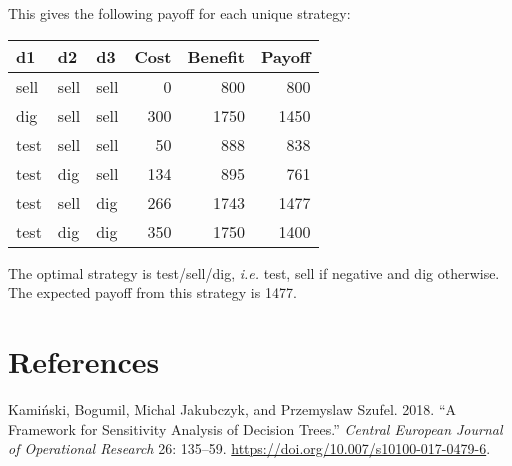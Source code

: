 \documentclass[
]{article}
\newenvironment{Shaded}{\begin{snugshade}}{\end{snugshade}}
\newcommand{\CommentTok}[1]{\textcolor[rgb]{0.56,0.35,0.01}{\textit{#1}}}
\newcommand{\KeywordTok}[1]{\textcolor[rgb]{0.13,0.29,0.53}{\textbf{#1}}}
\newcommand{\NormalTok}[1]{#1}
\newcommand{\OperatorTok}[1]{\textcolor[rgb]{0.81,0.36,0.00}{\textbf{#1}}}
\newcommand{\StringTok}[1]{\textcolor[rgb]{0.31,0.60,0.02}{#1}}
\begin{document}
\begin{Shaded}
\end{Shaded}

This gives the following payoff for each unique strategy:

\begin{longtable}[]{@{}lllrrr@{}}
\toprule
d1 & d2 & d3 & Cost & Benefit & Payoff\tabularnewline
\midrule
\endhead
sell & sell & sell & 0 & 800 & 800\tabularnewline
dig & sell & sell & 300 & 1750 & 1450\tabularnewline
test & sell & sell & 50 & 888 & 838\tabularnewline
test & dig & sell & 134 & 895 & 761\tabularnewline
test & sell & dig & 266 & 1743 & 1477\tabularnewline
test & dig & dig & 350 & 1750 & 1400\tabularnewline
\bottomrule
\end{longtable}

The optimal strategy is test/sell/dig, \emph{i.e.} test, sell if
negative and dig otherwise. The expected payoff from this strategy is
1477.

\hypertarget{references}{%
\section*{References}\label{references}}

\hypertarget{refs}{}
\leavevmode\hypertarget{ref-kaminski:2018a}{}%
Kamiński, Bogumil, Michal Jakubczyk, and Przemyslaw Szufel. 2018. ``A
Framework for Sensitivity Analysis of Decision Trees.'' \emph{Central
European Journal of Operational Research} 26: 135--59.
\url{https://doi.org/10.007/s10100-017-0479-6}.
\end{document}
